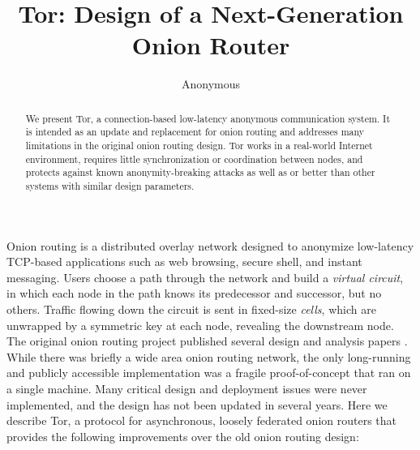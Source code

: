 \documentclass[times,10pt,twocolumn]{article}
\begin{document}

\title{Tor: Design of a Next-Generation Onion Router}

\author{Anonymous}

\maketitle
\thispagestyle{empty}

\begin{abstract}
We present Tor, a connection-based low-latency anonymous communication
system. It is intended as an update and replacement for onion routing
and addresses many limitations in the original onion routing design.
Tor works in a real-world Internet environment,
requires little synchronization or coordination between nodes, and
protects against known anonymity-breaking attacks as well
as or better than other systems with similar design parameters.
\end{abstract}



\label{sec:intro}

Onion routing is a distributed overlay network designed to anonymize
low-latency TCP-based applications such as web browsing, secure shell,
and instant messaging. Users choose a path through the network and
build a \emph{virtual circuit}, in which each node in the path knows its
predecessor and successor, but no others. Traffic flowing down the circuit
is sent in fixed-size \emph{cells}, which are unwrapped by a symmetric key
at each node, revealing the downstream node. The original onion routing
project published several design and analysis papers
\cite{or-jsac98,or-discex00,or-ih96,or-pet00}. While there was briefly
a wide area onion routing network,
the only long-running and publicly accessible
implementation was a fragile proof-of-concept that ran on a single
machine. Many critical design and deployment issues were never implemented,
and the design has not been updated in several years.
Here we describe Tor, a protocol for asynchronous, loosely
federated onion routers that provides the following improvements over
the old onion routing design:
\end{document}
